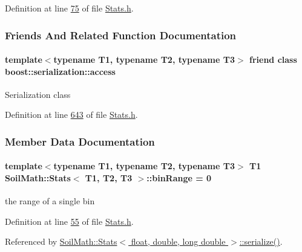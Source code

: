 Definition at line \hyperlink{_stats_8h_source_l00075}{75} of file \hyperlink{_stats_8h_source}{Stats.\+h}.



\subsubsection{Friends And Related Function Documentation}
\hypertarget{class_soil_math_1_1_stats_ac98d07dd8f7b70e16ccb9a01abf56b9c}{}
\paragraph[{boost\+::serialization\+::access}]{\setlength{\rightskip}{0pt plus 5cm}template$<$typename T1, typename T2, typename T3$>$ friend class boost\+::serialization\+::access\hspace{0.3cm}{\ttfamily [friend]}}\label{class_soil_math_1_1_stats_ac98d07dd8f7b70e16ccb9a01abf56b9c}
Serialization class 

Definition at line \hyperlink{_stats_8h_source_l00643}{643} of file \hyperlink{_stats_8h_source}{Stats.\+h}.



\subsubsection{Member Data Documentation}
\hypertarget{class_soil_math_1_1_stats_a00be1d2a705a8aba532fbe726001bbb2}{}
\paragraph[{bin\+Range}]{\setlength{\rightskip}{0pt plus 5cm}template$<$typename T1, typename T2, typename T3$>$ T1 {\bf Soil\+Math\+::\+Stats}$<$ T1, T2, T3 $>$\+::bin\+Range = 0}\label{class_soil_math_1_1_stats_a00be1d2a705a8aba532fbe726001bbb2}
the range of a single bin 

Definition at line \hyperlink{_stats_8h_source_l00055}{55} of file \hyperlink{_stats_8h_source}{Stats.\+h}.



Referenced by \hyperlink{_stats_8h_source_l00651}{Soil\+Math\+::\+Stats$<$ float, double, long double $>$\+::serialize()}.

